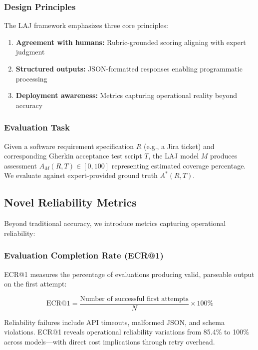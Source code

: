\subsubsection{Design Principles}

The LAJ framework emphasizes three core principles:

\begin{enumerate}[leftmargin=*]
    \item \textbf{Agreement with humans:} Rubric-grounded scoring aligning with expert judgment
    \item \textbf{Structured outputs:} JSON-formatted responses enabling programmatic processing
    \item \textbf{Deployment awareness:} Metrics capturing operational reality beyond accuracy
\end{enumerate}

\subsubsection{Evaluation Task}

Given a software requirement specification $R$ (e.g., a Jira ticket) and corresponding Gherkin acceptance test script $T$, the LAJ model $M$ produces assessment $A_M(R, T) \in [0, 100]$ representing estimated coverage percentage. We evaluate against expert-provided ground truth $A^*(R, T)$.

\subsection{Novel Reliability Metrics}

Beyond traditional accuracy, we introduce metrics capturing operational reliability:

\subsubsection{Evaluation Completion Rate (ECR@1)}

ECR@1 measures the percentage of evaluations producing valid, parseable output on the first attempt:

\begin{equation}
\text{ECR@1} = \frac{\text{Number of successful first attempts}}{N} \times 100\%
\end{equation}

Reliability failures include API timeouts, malformed JSON, and schema violations. ECR@1 reveals operational reliability variations from 85.4\% to 100\% across models---with direct cost implications through retry overhead.


